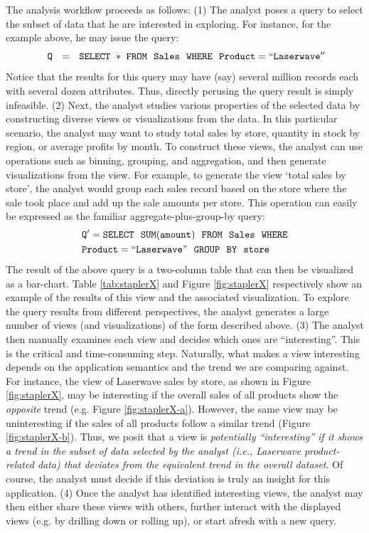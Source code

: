 The analysis workflow proceeds as follows:
(1) The analyst poses a query to select the subset of data that he are
interested in exploring.
For instance, for the example above, he may issue the query:
\noindent $${\tt \ Q \ \ = \ \ SELECT \ * \ FROM \ \  Sales \ \ WHERE \ \
Product=``Laserwave''} $$ \noindent Notice that the results for this query may
have (say) several million records each with several dozen attributes.
Thus, directly perusing the query result is simply infeasible.
(2) Next, the analyst studies various properties of the selected data by
constructing diverse views or visualizations from the data. In this particular
scenario, the analyst may want to study total sales by store, quantity in stock
by region, or average profits by month. To construct these views, the analyst
can use operations such as binning, grouping, and aggregation, and then generate
visualizations from the view. For example, to generate the view `total sales by
store', the analyst would group each sales record based on the store where the
sale took place and add up the sale amounts per store. This operation can easily
be expressed as the familiar aggregate-plus-group-by query:
\noindent
\begin{align*}
& \tt Q' = SELECT \ \ SUM(amount) \ \ FROM \ \  Sales \ \ WHERE \\
& \tt Product=``Laserwave" \ \ GROUP  \ \ BY \ \ store
\end{align*}
The result of the above query is a two-column table that can then be visualized
as a bar-chart. Table \ref{tab:staplerX} and Figure
\ref{fig:staplerX} respectively show an example of the results of this view and
the associated visualization.
To explore the query results from different perspectives, the analyst generates
a large number of views (and visualizations) of the form described above.
(3) The analyst then manually examines each view and decides
which ones are ``interesting''. This is the critical and time-consuming step.
Naturally, what makes a view interesting depends on the 
application semantics and the trend we are comparing against.
For instance, the view of Laserwave sales by store, as shown in Figure
\ref{fig:staplerX}, may be interesting if the overall sales of all products show
the {\it opposite} trend (e.g. Figure \ref{fig:staplerX-a}). However, the same
view may be uninteresting if the sales of all products follow a similar trend (Figure \ref{fig:staplerX-b}).
Thus, we posit that  a view is {\em potentially ``interesting'' if it shows 
a trend in the subset of data selected by the analyst
(i.e., Laserwave product-related data)
that deviates from the equivalent trend in the overall dataset}.
Of course, the analyst must decide if this deviation 
is truly an insight for this application.
(4) Once the analyst has identified interesting views, the analyst may
then either share these views with others, further interact with
the displayed views (e.g. by drilling down or rolling up), or
start afresh with a new query.


